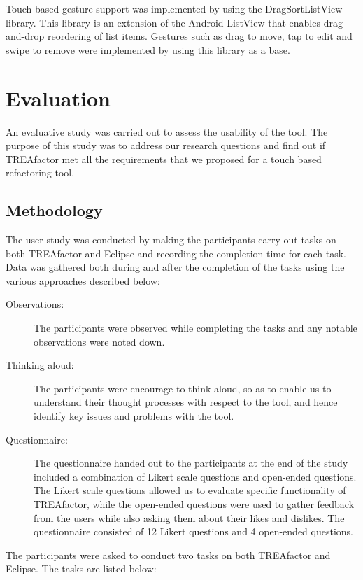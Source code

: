 \documentclass[10.5pt,twocolumn]{article}
\begin{document}
Touch based gesture support was implemented by using the DragSortListView library. This library is an extension of the Android ListView that enables drag-and-drop reordering of list items. Gestures such as drag to move, tap to edit and swipe to remove were implemented by using this library as a base.



\section{Evaluation}

An evaluative study was carried out to assess the usability of the tool. The purpose of this study was to address our research questions and find out if TREAfactor met all the requirements that we proposed for a touch based refactoring tool.

\subsection{Methodology}
The user study was conducted by making the participants carry out tasks on both TREAfactor and Eclipse and recording the completion time for each task. Data was gathered both during and after the completion of the tasks using the various approaches described below:

\begin{description}
    \item [Observations:] The participants were observed while completing the tasks and any notable observations were noted down.
    \item [Thinking aloud:] The participants were encourage to think aloud, so as to enable us to understand their thought processes with respect to the tool, and hence identify key issues and problems with the tool.
    \item [Questionnaire:] The questionnaire handed out to the participants at the end of the study included a combination of Likert scale questions and open-ended questions. The Likert scale questions allowed us to evaluate specific functionality of TREAfactor, while the open-ended questions were used to gather feedback from the users while also asking them about their likes and dislikes. The questionnaire consisted of 12 Likert questions and 4 open-ended questions.
\end{description}

The participants were asked to conduct two tasks on both TREAfactor and Eclipse. The tasks are listed below:
\end{document}
